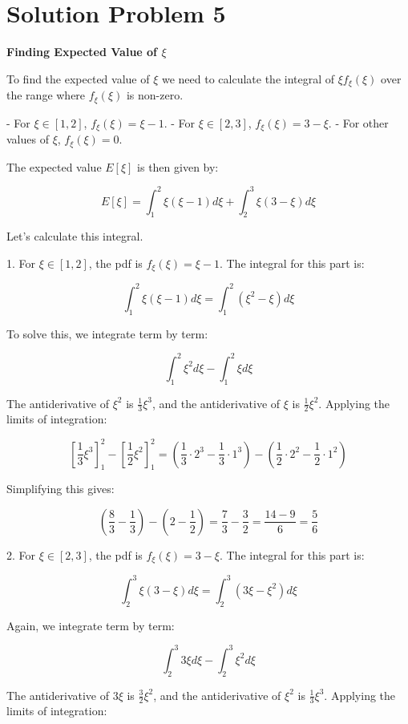 \section*{Solution Problem 5}

\textbf{Finding Expected Value of $\xi$}

To find the expected value of \(\xi\) we need to calculate the integral of \(\xi f_{\xi}(\xi)\) over the range where \(f_{\xi}(\xi)\) is non-zero.

- For \(\xi \in [1, 2]\), \(f_{\xi}(\xi) = \xi - 1\).
- For \(\xi \in [2, 3]\), \(f_{\xi}(\xi) = 3 - \xi\).
- For other values of \(\xi\), \(f_{\xi}(\xi) = 0\).

The expected value \(E[\xi]\) is then given by:

\[
    E[\xi] = \int_{1}^{2} \xi(\xi - 1) d\xi + \int_{2}^{3} \xi(3 - \xi) d\xi
\]

Let's calculate this integral.

1. For \(\xi \in [1, 2]\), the pdf is \(f_{\xi}(\xi) = \xi - 1\). The integral for this part is:

\[
    \int_{1}^{2} \xi(\xi - 1) d\xi = \int_{1}^{2} (\xi^2 - \xi) d\xi
\]

To solve this, we integrate term by term:

\[
    \int_{1}^{2} \xi^2 d\xi - \int_{1}^{2} \xi d\xi
\]

The antiderivative of \(\xi^2\) is \(\frac{1}{3}\xi^3\), and the antiderivative of \(\xi\) is \(\frac{1}{2}\xi^2\). Applying the limits of integration:

\[
    \left[\frac{1}{3}\xi^3\right]_{1}^{2} - \left[\frac{1}{2}\xi^2\right]_{1}^{2} = \left(\frac{1}{3} \cdot 2^3 - \frac{1}{3} \cdot 1^3\right) - \left(\frac{1}{2} \cdot 2^2 - \frac{1}{2} \cdot 1^2\right)
\]

Simplifying this gives:

\[
    \left(\frac{8}{3} - \frac{1}{3}\right) - \left(2 - \frac{1}{2}\right) = \frac{7}{3} - \frac{3}{2} = \frac{14 - 9}{6} = \frac{5}{6}
\]

2. For \(\xi \in [2, 3]\), the pdf is \(f_{\xi}(\xi) = 3 - \xi\). The integral for this part is:

\[
    \int_{2}^{3} \xi(3 - \xi) d\xi = \int_{2}^{3} (3\xi - \xi^2) d\xi
\]

Again, we integrate term by term:

\[
    \int_{2}^{3} 3\xi d\xi - \int_{2}^{3} \xi^2 d\xi
\]

The antiderivative of \(3\xi\) is \(\frac{3}{2}\xi^2\), and the antiderivative of \(\xi^2\) is \(\frac{1}{3}\xi^3\). Applying the limits of integration:

